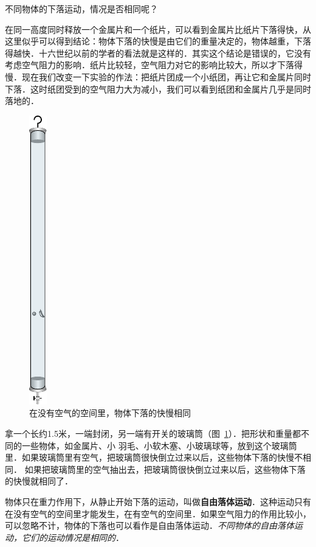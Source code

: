 不同物体的下落运动，情况是否相同呢？

在同一高度同时释放一个金属片和一个纸片，可以看到金属片比纸片下落得快，从这里似乎可以得到结论：物体下落的快慢是由它们的重量决定的，物体越重，下落得越快．十六世纪以前的学者的看法就是这样的．其实这个结论是错误的，它没有考虑空气阻力的影响．纸片比较轻，空气阻力对它的影响比较大，所以才下落得慢．现在我们改变一下实验的作法：把纸片团成一个小纸团，再让它和金属片同时下落．这时纸团受到的空气阻力大为减小，我们可以看到纸团和金属片几乎是同时落地的．
\begin{figure}[htp]
\centering
\includegraphics{fig/A/2-20.pdf}
\caption{在没有空气的空间里，物体下落的快慢相同}\label{fig_A_2-20}
\end{figure}

拿一个长约1.5米，一端封闭，另一端有开关的玻璃筒（图~\ref{fig_A_2-20}）．把形状和重量都不同的一些物体，如金属片、小
羽毛、小软木塞、小玻璃球等，放到这个玻璃筒里．如果玻璃筒里有空气，把玻璃筒很快倒立过来以后，这些物体下落的快慢不相同．
如果把玻璃筒里的空气抽出去，把玻璃筒很快倒立过来以后，这些物体下落的快慢就相同了．



物体只在重力作用下，从静止开始下落的运动，叫做\textbf{自由落体运动}．这种运动只有在没有空气的空间里才能发生，在有空气的空间里．如果空气阻力的作用比较小，可以忽略不计，物体的下落也可以看作是自由落体运动．\textit{不同物体的自由落体运动，它们的运动情况是相同的}．

